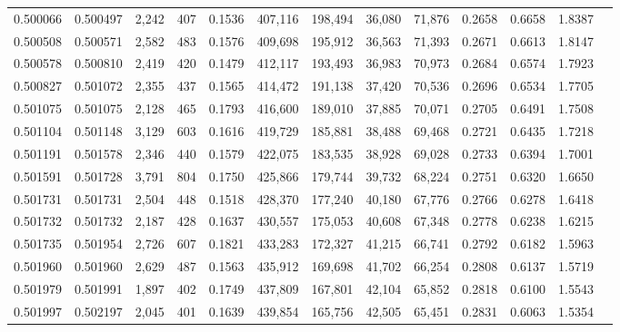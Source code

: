 \begin{tabular}{rrrrrrrrrrrrr}
0.500066 & 0.500497 &  2,242 &   407 &                                     0.1536 & 407,116 & 198,494 &  36,080 &  71,876 & 0.2658 & 0.6658 & 1.8387 \\
0.500508 & 0.500571 &  2,582 &   483 &                                     0.1576 & 409,698 & 195,912 &  36,563 &  71,393 & 0.2671 & 0.6613 & 1.8147 \\
0.500578 & 0.500810 &  2,419 &   420 &                                     0.1479 & 412,117 & 193,493 &  36,983 &  70,973 & 0.2684 & 0.6574 & 1.7923 \\
0.500827 & 0.501072 &  2,355 &   437 &                                     0.1565 & 414,472 & 191,138 &  37,420 &  70,536 & 0.2696 & 0.6534 & 1.7705 \\
0.501075 & 0.501075 &  2,128 &   465 &                                     0.1793 & 416,600 & 189,010 &  37,885 &  70,071 & 0.2705 & 0.6491 & 1.7508 \\
0.501104 & 0.501148 &  3,129 &   603 &                                     0.1616 & 419,729 & 185,881 &  38,488 &  69,468 & 0.2721 & 0.6435 & 1.7218 \\
0.501191 & 0.501578 &  2,346 &   440 &                                     0.1579 & 422,075 & 183,535 &  38,928 &  69,028 & 0.2733 & 0.6394 & 1.7001 \\
0.501591 & 0.501728 &  3,791 &   804 &                                     0.1750 & 425,866 & 179,744 &  39,732 &  68,224 & 0.2751 & 0.6320 & 1.6650 \\
0.501731 & 0.501731 &  2,504 &   448 &                                     0.1518 & 428,370 & 177,240 &  40,180 &  67,776 & 0.2766 & 0.6278 & 1.6418 \\
0.501732 & 0.501732 &  2,187 &   428 &                                     0.1637 & 430,557 & 175,053 &  40,608 &  67,348 & 0.2778 & 0.6238 & 1.6215 \\
0.501735 & 0.501954 &  2,726 &   607 &                                     0.1821 & 433,283 & 172,327 &  41,215 &  66,741 & 0.2792 & 0.6182 & 1.5963 \\
0.501960 & 0.501960 &  2,629 &   487 &                                     0.1563 & 435,912 & 169,698 &  41,702 &  66,254 & 0.2808 & 0.6137 & 1.5719 \\
0.501979 & 0.501991 &  1,897 &   402 &                                     0.1749 & 437,809 & 167,801 &  42,104 &  65,852 & 0.2818 & 0.6100 & 1.5543 \\
0.501997 & 0.502197 &  2,045 &   401 &                                     0.1639 & 439,854 & 165,756 &  42,505 &  65,451 & 0.2831 & 0.6063 & 1.5354 \\

\end{tabular}
